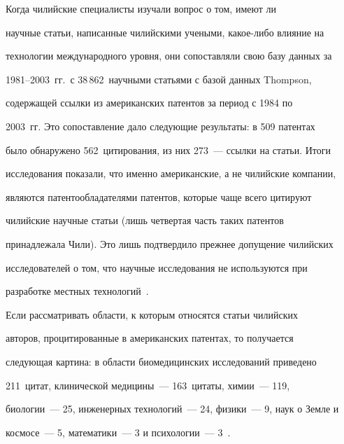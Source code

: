      


     Когда чилийские специалисты изучали вопрос о том, имеют ли 


научные статьи, написанные чилийскими учеными, какое-либо влияние на 


технологии международного уровня, они сопоставляли свою базу данных за 


1981--2003~гг.\ с 38\,862~научными статьями с базой данных Thompson, 


содержащей ссылки из американских патентов за период с 1984 по 


2003~гг. Это сопоставление дало следующие результаты: в 509 патентах 


было обнаружено 562~цитирования, из них 273~--- ссылки на статьи. Итоги 


исследования показали, что именно американские, а не чилийские компании, 


являются патентообладателями патентов, которые чаще всего цитируют 


чилийские научные статьи (лишь четвертая часть таких патентов 


принадлежала Чили). Это лишь подтвердило прежнее допущение чилийских 


исследователей о том, что научные исследования не используются при 


разработке местных технологий~\cite{17-koz}. 


     


     Если рассматривать области, к которым относятся статьи чилийских 


авторов, процитированные в американских патентах, то получается 


следующая картина: в области биомедицинских исследований приведено 


211~цитат, клинической медицины~--- 163~цитаты, химии~--- 119, 


биологии~--- 25, инженерных технологий~--- 24, физики~--- 9, наук о Земле и 


космосе~--- 5, математики~--- 3 и психологии~--- 3~\cite{17-koz}. 






